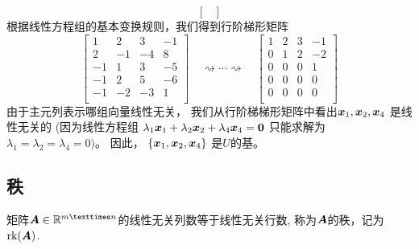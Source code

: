 \begin{example}[确定基]
\begin{equation}
\begin{bmatrix}
        \end{bmatrix}
    \end{equation}
    根据线性方程组的基本变换规则，我们得到行阶梯形矩阵
    \[
        \begin{bmatrix}
           1 & 2 & 3 & -1 \\
           2 & -1 & -4 & 8 \\
          -1 & 1 & 3 & -5 \\
          -1 & 2 & 5 & -6 \\
          -1 & -2 & -3 & 1 \\
        \end{bmatrix}
        \quad \rightsquigarrow \cdots \rightsquigarrow \quad
        \begin{bmatrix}
           1 & 2 & 3 & -1 \\
           0 & 1 & 2 & -2 \\
           0 & 0 & 0 & 1 \\
           0 & 0 & 0 & 0 \\
           0 & 0 & 0 & 0 \\
        \end{bmatrix}
    \]
    由于主元列表示哪组向量线性无关，
    我们从行阶梯梯形矩阵中看出$\boldsymbol{x}_1 , \boldsymbol{x}_2 , \boldsymbol{x}_4$
    是线性无关的
    (因为线性方程组
    $\lambda_1\boldsymbol{x}_1 + \lambda_2\boldsymbol{x}_2 + \lambda_4\boldsymbol{x}_4 = \boldsymbol{0}$
    只能求解为$\lambda_1 = \lambda_2 = \lambda_4 = 0)$。
    因此， $\{\boldsymbol{x}_1, \boldsymbol{x}_2, \boldsymbol{x}_4\}$ 是$U$的基。
\end{example}

\subsection{秩}

矩阵$\bs{A}\in \mb{R}^{m×n}$的线性无关列数等于线性无关行数,
称为$\boldsymbol{A}$的秩，记为$\mathrm{rk}(\boldsymbol{A})$.


